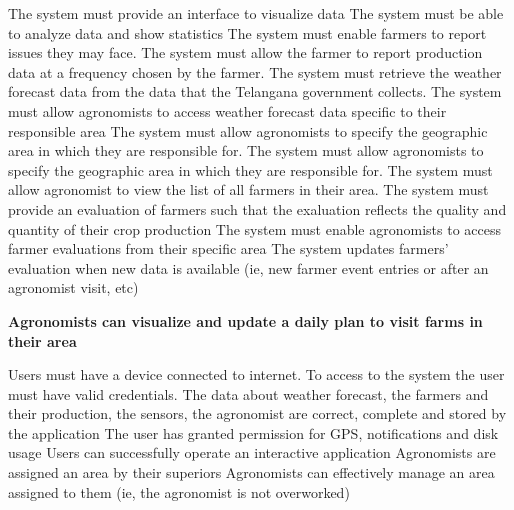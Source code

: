 \begin{itemize}
\begin{itemize}
 The system must provide an interface to visualize data
 The system must be able to analyze data and show statistics
 The system must enable farmers to report issues they may face.
 The system must allow the farmer to report production data at a frequency chosen by the farmer.
 The system must retrieve the weather forecast data from the data that the Telangana government collects.
 The system must allow agronomists to access weather forecast data specific to their responsible area
 The system must allow agronomists to specify the geographic area in which they are responsible for.
 The system must allow agronomists to specify the geographic area in which they are responsible for.
  The system must allow agronomist to view the list of all farmers in their area.
  The system must provide an evaluation of farmers such that the exaluation reflects the quality and quantity of their crop production
  The system must enable agronomists to access farmer evaluations from their specific area
  The system updates farmers' evaluation when new data is available (ie, new farmer event entries or after an agronomist visit, etc)
\end{itemize}

 \textbf{Agronomists can visualize and update a daily plan to visit farms in their area}
\begin{itemize}
  Users must have a device connected to internet.
 To access to the system the user must have valid credentials.
 The data about weather forecast, the farmers and their production, the sensors, the agronomist are correct, complete and stored by the application
 The user has granted permission for GPS, notifications and disk usage
 Users can successfully operate an interactive application
 Agronomists are assigned an area by their superiors
 Agronomists can effectively manage an area assigned to them (ie, the agronomist is not overworked)



\end{itemize}
\end{itemize}
